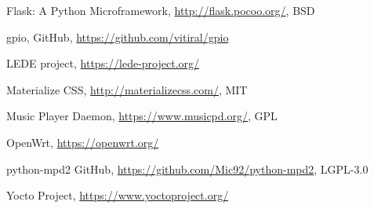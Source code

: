 \documentclass[10pt,a4paper]{article}
\begin{document}
\begin{thebibliography}{9}

		Flask: A Python Microframework,
		\url{http://flask.pocoo.org/},
		BSD

		gpio,
		GitHub,
		\url{https://github.com/vitiral/gpio}

		LEDE project,
		\url{https://lede-project.org/}

		Materialize CSS,
		\url{http://materializecss.com/},
		MIT

		Music Player Daemon,
		\url{https://www.musicpd.org/},
		GPL

		OpenWrt,
		\url{https://openwrt.org/}
	
		python-mpd2
		GitHub,
		\url{https://github.com/Mic92/python-mpd2},
		LGPL-3.0

		Yocto Project,
		\url{https://www.yoctoproject.org/}

\end{thebibliography}
\end{document}
